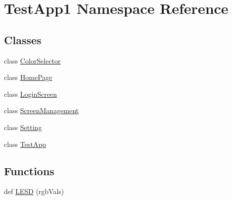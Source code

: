 \hypertarget{namespaceTestApp1}{}\section{Test\+App1 Namespace Reference}
\label{namespaceTestApp1}
\subsection*{Classes}
\begin{DoxyCompactItemize}
\item 
class \hyperlink{classTestApp1_1_1ColorSelector}{Color\+Selector}
\item 
class \hyperlink{classTestApp1_1_1HomePage}{Home\+Page}
\item 
class \hyperlink{classTestApp1_1_1LoginScreen}{Login\+Screen}
\item 
class \hyperlink{classTestApp1_1_1ScreenManagement}{Screen\+Management}
\item 
class \hyperlink{classTestApp1_1_1Setting}{Setting}
\item 
class \hyperlink{classTestApp1_1_1TestApp}{Test\+App}
\end{DoxyCompactItemize}
\subsection*{Functions}
\begin{DoxyCompactItemize}
\item 
def \hyperlink{namespaceTestApp1_a60e2e2ce5fa9823b4c739bc324cc7e45}{L\+E\+SD} (rgb\+Vals)
\end{DoxyCompactItemize}
